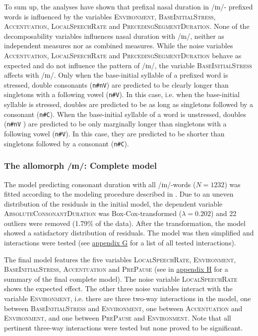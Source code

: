 To sum up, the analyses have shown that prefixal nasal duration in /ɪn/- prefixed words is influenced by the variables \textsc{Environment}, \textsc{BaseInitialStress}, \textsc{Accentuation}, \textsc{LocalSpeechRate} and \textsc{PrecedingSegmentDuration}. None of the decomposability variables influences nasal duration with /ɪn/, neither as independent measures nor as combined measures. 
While the noise variables \textsc{Accentuation}, \textsc{LocalSpeechRate} and \textsc{PrecedingSegmentDuration} behave as expected and do not influence the  pattern of /ɪn/, the variable \textsc{BaseInitialStress} affects  with /ɪn/. 
Only when the base-initial syllable of a prefixed word is stressed, double consonants (\texttt{n\#nV}) are predicted to be clearly longer than singletons with a following vowel (\texttt{n\#V}). In this case, i.e. when the base-initial syllable is stressed, doubles are predicted to be as long as singletons followed by a consonant (\texttt{n\#C}). When the base-initial syllable of a word is unstressed, doubles (\texttt{n\#nV} ) are predicted to be only marginally longer than singletons with a following vowel (\texttt{n\#V}). In this case, they are predicted to be shorter than singletons followed by a consonant (\texttt{n\#C}).

\subsubsection{The allomorph /ɪn/: Complete model}


The model predicting consonant duration with all /ɪn/-words ($N=1232$) was fitted according to the modeling procedure described in . Due to an uneven distribution of the residuals in the initial model, the dependent variable \textsc{AbsoluteConsonantDuration} was Box-Cox-transformed ($\lambda = 0.202$) and 22 outliers were removed (1.79\% of the data). 
After the transformation, the model showed a satisfactory distribution of residuals. The model was then simplified and interactions were tested (see \hyperref[Appendix G Summaries of tested interactions in experimental study]{appendix G} for a list of all tested interactions).




The final model features the five variables \textsc{LocalSpeechRate}, \textsc{Environment}, \textsc{BaseInitialStress}, \textsc{Accentuation} and \textsc{PrePause} (see  in \hyperref[Appendix H: Model Summaries Experiment]{appendix H} for a summary of the final complete model). 
The noise variable \textsc{LocalSpeechRate} shows the expected effect. The other three noise variables interact with the variable \textsc{Environment}, i.e. there are three two-way interactions in the model, one between \textsc{BaseInitialStress} and \textsc{Environment}, one between \textsc{Accentuation} and \textsc{Environment}, and one between \textsc{PrePause} and \textsc{Environment}.  Note that all pertinent three-way interactions were tested but none proved to be significant.



